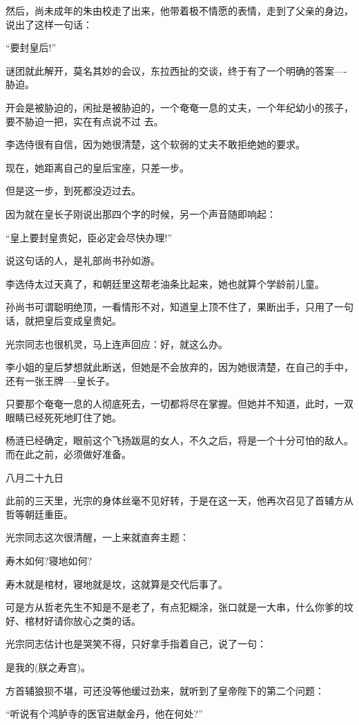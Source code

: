 \documentclass[11pt,a4paper,onecolumn]{article}
\begin{document}
然后，尚未成年的朱由校走了出来，他带着极不情愿的表情，走到了父亲的身边，说出了这样一句话：

``要封皇后!''

谜团就此解开，莫名其妙的会议，东拉西扯的交谈，终于有了一个明确的答案----胁迫。

开会是被胁迫的，闲扯是被胁迫的，一个奄奄一息的丈夫，一个年纪幼小的孩子，要不胁迫一把，实在有点说不过
去。

李选侍很有自信，因为她很清楚，这个软弱的丈夫不敢拒绝她的要求。

现在，她距离自己的皇后宝座，只差一步。

但是这一步，到死都没迈过去。

因为就在皇长子刚说出那四个字的时候，另一个声音随即响起：

``皇上要封皇贵妃，臣必定会尽快办理!''

说这句话的人，是礼部尚书孙如游。

李选侍太过天真了，和朝廷里这帮老油条比起来，她也就算个学龄前儿童。

孙尚书可谓聪明绝顶，一看情形不对，知道皇上顶不住了，果断出手，只用了一句话，就把皇后变成皇贵妃。

光宗同志也很机灵，马上连声回应：好，就这么办。

李小姐的皇后梦想就此断送，但她是不会放弃的，因为她很清楚，在自己的手中，还有一张王牌----皇长子。

只要那个奄奄一息的人彻底死去，一切都将尽在掌握。但她并不知道，此时，一双眼睛已经死死地盯住了她。

杨涟已经确定，眼前这个飞扬跋扈的女人，不久之后，将是一个十分可怕的敌人。而在此之前，必须做好准备。

八月二十九日

此前的三天里，光宗的身体丝毫不见好转，于是在这一天，他再次召见了首辅方从哲等朝廷重臣。

光宗同志这次很清醒，一上来就直奔主题：

寿木如何?寝地如何?

寿木就是棺材，寝地就是坟，这就算是交代后事了。

可是方从哲老先生不知是不是老了，有点犯糊涂，张口就是一大串，什么你爹的坟好、棺材好请你放心之类的话。

光宗同志估计也是哭笑不得，只好拿手指着自己，说了一句：

是我的(朕之寿宫)。

方首辅狼狈不堪，可还没等他缓过劲来，就听到了皇帝陛下的第二个问题：

``听说有个鸿胪寺的医官进献金丹，他在何处?''
\end{document}
